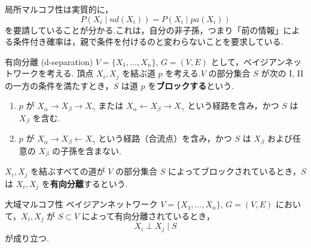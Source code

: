 \documentclass[uplatex, dvipdfmx]{jsarticle}
\begin{document}
局所マルコフ性は実質的に，
\begin{equation}
    P(X_i \mid nd(X_i)) = P(X_i \mid pa(X_i))
\end{equation}
を要請していることが分かる.これは，自分の非子孫，つまり「前の情報」による条件付き確率は，親で条件を付けるのと変わらないことを要求している.

\begin{defn}[label={defn:d-separation}]{有向分離 (d-separation)}
  $V = \{X_1, \dots, X_n\}$, $G = (V, E)$ として，ベイジアンネットワークを考える.
  頂点 $X_i, X_j$ を結ぶ道 $p$ を考える.$V$ の部分集合 $S$ が次の I, II の一方の条件を満たすとき，$S$ は道 $p$ を\textbf{ブロックする}という.

  \begin{enumerate}
      \item[I.] $p$ が $X_\alpha \to X_\beta \to X_\gamma$ または $X_\alpha \leftarrow X_\beta \to X_\gamma$ という経路を含み，かつ $S$ は $X_\beta$ を含む.
      \item[II.] $p$ が $X_\alpha \to X_\beta \leftarrow X_\gamma$ という経路（合流点）を含み，かつ $S$ は $X_\beta$ および任意の $X_\beta$ の子孫を含まない.
  \end{enumerate}

  $X_i, X_j$ を結ぶすべての道が $V$ の部分集合 $S$ によってブロックされているとき，$S$ は $X_i, X_j$ を\textbf{有向分離}するという.
\end{defn}

\begin{thm}[label={thm:global_markov}]{大域マルコフ性}
  ベイジアンネットワーク $V = \{X_1, \dots, X_n\}$, $G = (V, E)$ において，$X_i, X_j$ が $S \subset V$ によって有向分離されているとき，
  \begin{equation}
      X_i \perp X_j \mid S
  \end{equation}
  が成り立つ.
\end{thm}
\end{document}
